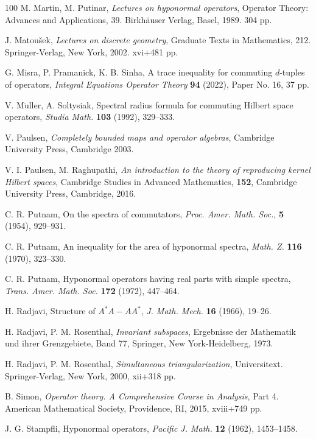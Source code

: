 \documentclass[10pt, a4paper, oneside, reqno]{amsproc}
\numberwithin{equation}{section}
\theoremstyle{remark}
\theoremstyle{definition}
\begin{document}
\begin{thebibliography}{100}
 M. Martin, M. Putinar, {\it Lectures on hyponormal operators}, 
Operator Theory: Advances and Applications, 39. Birkhäuser Verlag, Basel, 1989. 304 pp. 

 J. Matoušek, 
{\it Lectures on discrete geometry},
Graduate Texts in Mathematics, 212. Springer-Verlag, New York, 2002. xvi+481 pp.

 G. Misra, P. Pramanick, K. B. Sinha, 
A trace inequality for commuting $d$-tuples of operators,  {\it Integral Equations Operator Theory} {\bf 94} (2022), Paper No. 16, 37 pp.

 V. M$\ddot{\mbox{u}}$ller, A. Soltysiak, Spectral radius formula for commuting Hilbert space operators,
{\it Studia Math.} {\bf 103} (1992), 329--333.

 V. Paulsen, \textit{Completely bounded maps and operator algebras}, Cambridge University Press, Cambridge 2003.

 V. I. Paulsen, M. Raghupathi, {\it An introduction to the theory of reproducing kernel Hilbert spaces}, Cambridge Studies in Advanced Mathematics, {\bf 152}, Cambridge University Press, Cambridge, 2016. 

 C. R. Putnam, On the spectra of commutators, 
{\it Proc. Amer. Math. Soc.}, {\bf 5} (1954), 929--931.

 C. R. Putnam, 
An inequality for the area of hyponormal spectra,
{\it Math. Z.} {\bf 116} (1970), 323--330.

 C. R. Putnam, Hyponormal operators having real parts with simple spectra, {\it Trans. Amer. Math. Soc.} {\bf 172} (1972), 447--464.

 H. Radjavi, 
Structure of $A^*A - AA^*$, {\it 
J. Math. Mech.} {\bf 16} (1966), 19--26.
	
	 H. Radjavi, P. M. Rosenthal, \textit{Invariant subspaces}, Ergebnisse der Mathematik und ihrer Grenzgebiete, Band 77, Springer, New York-Heidelberg, 1973. 

 H. Radjavi, P. M. Rosenthal, 
{\it Simultaneous triangularization},
Universitext. Springer-Verlag, New York, 2000, xii+318 pp. 

 B. Simon, {\it Operator theory. A Comprehensive Course in Analysis}, Part 4. American Mathematical Society, Providence, RI, 2015, xviii+749 pp.

 J. G. Stampfli, 
Hyponormal operators,
{\it Pacific J. Math.} {\bf 12} (1962), 1453--1458.



\end{thebibliography}
\end{document}
